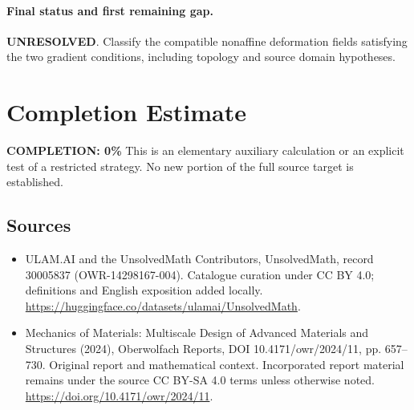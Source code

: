 \documentclass[11pt]{article}
\begin{document}
\paragraph{Final status and first remaining gap.}
\textbf{UNRESOLVED}. Classify the compatible nonaffine deformation fields satisfying the two gradient conditions, including topology and source domain hypotheses.

\section{Completion Estimate}
\noindent\textbf{COMPLETION: 0\%}
This is an elementary auxiliary calculation or an explicit test of a restricted strategy. No new portion of the full source target is established.

\subsection{Sources}
\begin{itemize}
\item[\hypertarget{source:30005837:1}{S1}] ULAM.AI and the UnsolvedMath Contributors, UnsolvedMath, record 30005837 (OWR-14298167-004). Catalogue curation under CC BY 4.0; definitions and English exposition added locally.
\url{https://huggingface.co/datasets/ulamai/UnsolvedMath}.
\item[\hypertarget{source:30005837:2}{S2}] Mechanics of Materials: Multiscale Design of Advanced Materials and Structures (2024), Oberwolfach Reports, DOI 10.4171/owr/2024/11, pp. 657--730. Original report and mathematical context. Incorporated report material remains under the source CC BY-SA 4.0 terms unless otherwise noted.
\url{https://doi.org/10.4171/owr/2024/11}.
\end{itemize}
\label{end:30005837}
\end{document}
